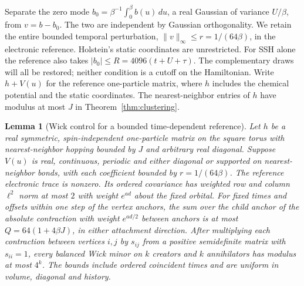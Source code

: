 \documentclass[11pt]{article}
\newtheorem{lemma}{Lemma}
\begin{document}
Separate the zero mode $b_0=\beta^{-1}\int_0^\beta b(u)\,du$, a real Gaussian of variance $U/\beta$, from $v=b-b_0$. The two are independent by Gaussian orthogonality. We retain the entire bounded temporal perturbation, $\|v\|_\infty\le r=1/(64\beta)$, in the electronic reference. Holstein's static coordinates are unrestricted. For SSH alone the reference also takes $|b_0|\le R=4096(t+U+\tau)$. The complementary draws will all be restored; neither condition is a cutoff on the Hamiltonian. Write $h+V(u)$ for the reference one-particle matrix, where $h$ includes the chemical potential and the static coordinates. The nearest-neighbor entries of $h$ have modulus at most $J$ in Theorem~\ref{thm:clustering}.

\begin{lemma}[Wick control for a bounded time-dependent reference]\label{lem:wick}
Let $h$ be a real symmetric, spin-independent one-particle matrix on the square torus with nearest-neighbor hopping bounded by $J$ and arbitrary real diagonal. Suppose $V(u)$ is real, continuous, periodic and either diagonal or supported on nearest-neighbor bonds, with each coefficient bounded by $r=1/(64\beta)$. The reference electronic trace is nonzero. Its ordered covariance has weighted row and column $\ell^2$ norm at most $2$ with weight $e^{a d}$ about the fixed orbital. For fixed times and offsets within one step of the vertex anchors, the sum over the child anchor of the absolute contraction with weight $e^{a d/2}$ between anchors is at most $Q=64(1+4\beta J)$, in either attachment direction. After multiplying each contraction between vertices $i,j$ by $s_{ij}$ from a positive semidefinite matrix with $s_{ii}=1$, every balanced Wick minor on $k$ creators and $k$ annihilators has modulus at most $4^k$. The bounds include ordered coincident times and are uniform in volume, diagonal and history.
\end{lemma}
\end{document}
